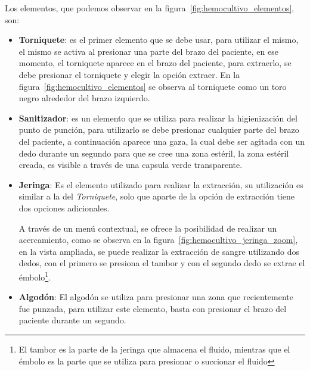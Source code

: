 Los elementos, que podemos observar en la
figura~\ref{fig:hemocultivo_elementos}, son:

\begin{itemize}
\item \textbf{Torniquete}: es el primer elemento que se debe usar, para utilizar
    el mismo, el mismo se activa al presionar una parte del brazo del paciente,
    en ese momento, el torniquete aparece en el brazo del paciente, para
    extraerlo, se debe presionar el torniquete y elegir la opción extraer. En la
    figura~\ref{fig:hemocultivo_elementos} se observa al torniquete como un toro
    negro alrededor del brazo izquierdo.

\item \textbf{Sanitizador}: es un elemento que se utiliza para realizar la
    higienización del punto de punción, para utilizarlo se debe presionar
    cualquier parte del brazo del paciente, a continuación aparece una gaza, la
    cual debe ser agitada con un dedo durante un segundo para que se cree una
    zona estéril, la zona estéril creada, es visible a través de una capsula
    verde transparente.

\item \textbf{Jeringa}: Es el elemento utilizado para realizar la extracción, su
    utilización es similar a la del \emph{Torniquete}, solo que aparte de la
    opción de extracción tiene dos opciones adicionales.

    A través de un menú contextual, se ofrece la posibilidad de realizar un
    acercamiento, como se observa en la
    figura~\ref{fig:hemocultivo_jeringa_zoom}, en la vista ampliada, se puede
    realizar la extracción de sangre utilizando dos dedos, con el primero se
    presiona el tambor y con el segundo dedo se extrae el émbolo\footnote{El
        tambor es la parte de la jeringa que almacena el fluido, mientras que el
        émbolo es la parte que se utiliza para presionar o succionar el fluido}.
    
\item \textbf{Algodón}: El algodón se utiliza para presionar una zona que
    recientemente fue punzada, para utilizar este elemento, basta con presionar
    el brazo del paciente durante un segundo.

\end{itemize}


